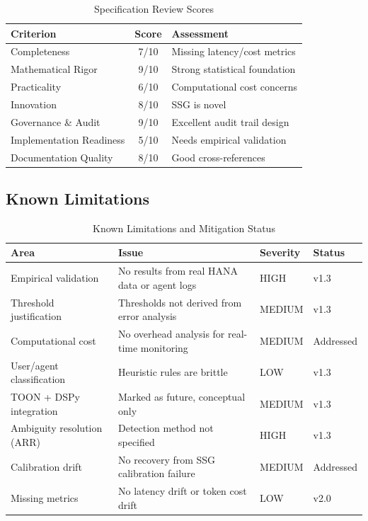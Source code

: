 \begin{table}[htbp]
\centering
\caption{Specification Review Scores}
\label{tab:review-scores}
\begin{tabular}{l c l}
\toprule
\textbf{Criterion} & \textbf{Score} & \textbf{Assessment} \\
\midrule
Completeness & 7/10 & Missing latency/cost metrics \\
Mathematical Rigor & 9/10 & Strong statistical foundation \\
Practicality & 6/10 & Computational cost concerns \\
Innovation & 8/10 & SSG is novel \\
Governance \& Audit & 9/10 & Excellent audit trail design \\
Implementation Readiness & 5/10 & Needs empirical validation \\
Documentation Quality & 8/10 & Good cross-references \\
\bottomrule
\end{tabular}
\end{table}

\subsection{Known Limitations}

\begin{table}[htbp]
\centering
\footnotesize
\caption{Known Limitations and Mitigation Status}
\label{tab:limitations}
\begin{tabularx}{\textwidth}{@{}l X l l@{}}
\toprule
\textbf{Area} & \textbf{Issue} & \textbf{Severity} & \textbf{Status} \\
\midrule
Empirical validation & No results from real HANA data or agent logs & HIGH & v1.3 \\
Threshold justification & Thresholds not derived from error analysis & MEDIUM & v1.3 \\
Computational cost & No overhead analysis for real-time monitoring & MEDIUM & Addressed \\
User/agent classification & Heuristic rules are brittle & LOW & v1.3 \\
TOON + DSPy integration & Marked as future, conceptual only & MEDIUM & v1.3 \\
Ambiguity resolution (ARR) & Detection method not specified & HIGH & v1.3 \\
Calibration drift & No recovery from SSG calibration failure & MEDIUM & Addressed \\
Missing metrics & No latency drift or token cost drift & LOW & v2.0 \\
\bottomrule
\end{tabularx}
\end{table}

